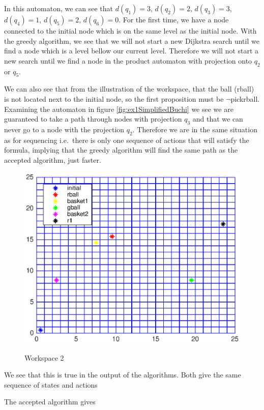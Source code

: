 In this automaton, we can see that $d(q_1)=3$, $d(q_2)=2$, $d(q_3)=3$, $d(q_4)=1$, $d(q_5)=2$, $d(q_6)=0$. For the first time, we have a node connected to the initial node which is on the same level as the initial node. With the greedy algorithm, we see that we will not start a new Dijkstra search until we find a node which is a level bellow our current level. Therefore we will not start a new search until we find a node in the product automaton with projection onto $q_2$ or $q_5$. 

We can also see that from the illustration of the workspace, that the ball (rball) is not located next to the initial node, so the first proposition must be $\neg$pickrball. Examining the automaton in figure \ref{fig:ex1SimplifiedBuchi} we see we are guaranteed to take a path through nodes with projection $q_3$ and that we can never go to a node with the projection $q_2$. Therefore we are in the same situation as for sequencing i.e.\ there is only one sequence of actions that will satisfy the formula, implying that the greedy algorithm will find the same path as the accepted algorithm, just faster. 

\begin{figure}[!htb]
\centering
\includegraphics[scale=1]{workspace2.eps}
\label{fig:workspace2}
\caption{Workspace 2}
\end{figure}

We see that this is true in the output of the algorithms. Both give the same sequence of states and actions

The accepted algorithm gives \\


